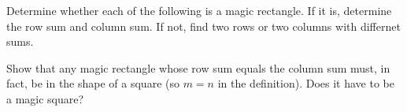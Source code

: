 \documentclass[11pt]{article}
\renewenvironment{problem}{\begin{problems}}{\end{problems}\vspace{5pt}}
\begin{document}
\setcounter{subfigure}{0}
\begin{problem}[4=2+2 points]
Determine whether each of the following is a magic rectangle. If it is, determine the row sum and column sum.
If not, find two rows or two columns with differnet sums.
\begin{figure}[H]
\centering
{} \qquad \qquad
{}
\end{figure}
\end{problem}

\begin{problem}[4 points]
Show that any magic rectangle whose row sum equals the column sum must, in fact, be in the shape of a square
(so $m = n$ in the definition). Does it have to be a magic square?
\end{problem}
\end{document}
